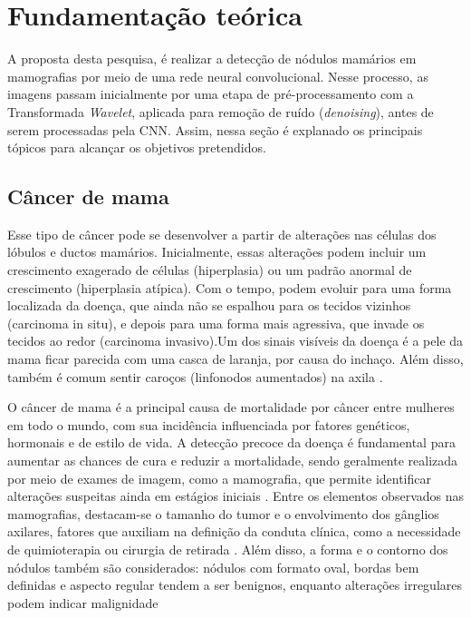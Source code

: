 \chapter{Fundamentação teórica}\label{cap:fund-teorica}
A proposta desta pesquisa, é realizar a detecção de nódulos mamários em mamografias por meio de uma rede neural convolucional. Nesse processo, as imagens passam inicialmente por uma etapa de pré-processamento com a Transformada \textit{Wavelet}, aplicada para remoção de ruído (\textit{denoising}), antes de serem processadas pela CNN. Assim, nessa seção é explanado os principais tópicos para alcançar os objetivos pretendidos.

\section{Câncer de mama}\label{sec:Câncer de mama}

Esse tipo de câncer pode se desenvolver a partir de alterações nas células dos lóbulos e ductos mamários. Inicialmente, essas alterações podem incluir um crescimento exagerado de células (hiperplasia) ou um padrão anormal de crescimento (hiperplasia atípica). Com o tempo, podem evoluir para uma forma localizada da doença, que ainda não se espalhou para os tecidos vizinhos (carcinoma in situ), e depois para uma forma mais agressiva, que invade os tecidos ao redor (carcinoma invasivo).Um dos sinais visíveis da doença é a pele da mama ficar parecida com uma casca de laranja, por causa do inchaço. Além disso, também é comum sentir caroços (linfonodos aumentados) na axila \cite{Bravo_Lopes_Tijolin_Nunes_Lenhani_Junior_Ceranto_2021}.

O câncer de mama é a principal causa de mortalidade por câncer entre mulheres em todo o mundo, com sua incidência influenciada por fatores genéticos, hormonais e de estilo de vida. A detecção precoce da doença é fundamental para aumentar as chances de cura e reduzir a mortalidade, sendo geralmente realizada por meio de exames de imagem, como a mamografia, que permite identificar alterações suspeitas ainda em estágios iniciais \cite{cadrin2023unleashing,SECHOPOULOS2021214}. Entre os elementos observados nas mamografias, destacam-se o tamanho do tumor e o envolvimento dos gânglios axilares, fatores que auxiliam na definição da conduta clínica, como a necessidade de quimioterapia ou cirurgia de retirada \cite{Bravo_Lopes_Tijolin_Nunes_Lenhani_Junior_Ceranto_2021}. Além disso, a forma e o contorno dos nódulos também são considerados: nódulos com formato oval, bordas bem definidas e aspecto regular tendem a ser benignos, enquanto alterações irregulares podem indicar malignidade \cite{PassigSilva2022}

